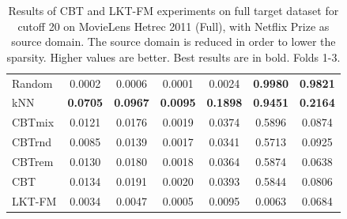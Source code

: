 \begin{table}[hbt]
\begin{tabulary}{\textwidth}{|L|CCCCCC|}
Random & 0.0002 & 0.0006 & 0.0001 & 0.0024 & \textbf{0.9980} & \textbf{0.9821} \\
kNN & \textbf{0.0705} & \textbf{0.0967} & \textbf{0.0095} & \textbf{0.1898} & \textbf{0.9451} & \textbf{0.2164} \\
CBTmix & 0.0121 & 0.0176 & 0.0019 & 0.0374 & 0.5896 & 0.0874 \\
CBTrnd & 0.0085 & 0.0139 & 0.0017 & 0.0341 & 0.5713 & 0.0925 \\
CBTrem & 0.0130 & 0.0180 & 0.0018 & 0.0364 & 0.5874 & 0.0638 \\
CBT & 0.0134 & 0.0191 & 0.0020 & 0.0393 & 0.5844 & 0.0806 \\
LKT-FM & 0.0034 & 0.0047 & 0.0005 & 0.0095 & 0.0063 & 0.0684 \\
\hline
\end{tabulary}
\caption{Results of CBT and LKT-FM experiments on full target dataset for cutoff 20 on MovieLens Hetrec 2011 (Full), with Netflix Prize as source domain. The source domain is reduced in order to lower the sparsity. Higher values are better. Best results are in bold. Folds 1-3.}
\end{table}

